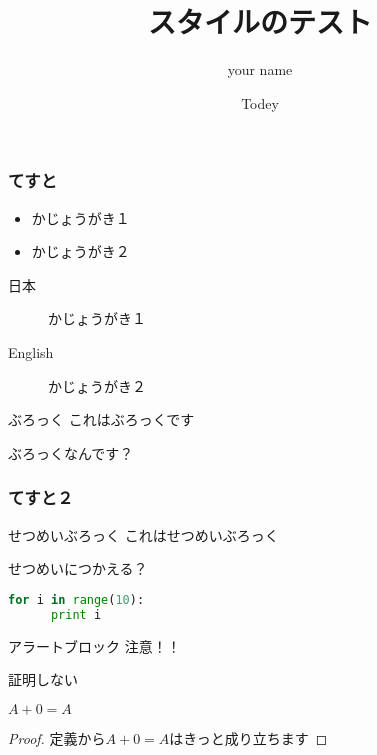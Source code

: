 \documentclass[17pt,aspectratio=1610,cjk,dvipdfmx]{beamer}
\title{スタイルのテスト}
\author{your name}
\date{Todey}
\begin{document}
\maketitle{}

\begin{frame}
  \frametitle{てすと}
  
  \begin{itemize}
      \item かじょうがき１
      \item かじょうがき２
  \end{itemize}

  \begin{description}
      \item[日本] かじょうがき１
      \item[English] かじょうがき２
  \end{description}
  
  \begin{block}{ぶろっく}
    これはぶろっくです

    ぶろっくなんです？
  \end{block}
\end{frame}

\begin{frame}[fragile]
  \frametitle{てすと２}

  \begin{exampleblock}{せつめいぶろっく}
    これはせつめいぶろっく

    せつめいにつかえる？

\begin{lstlisting}[language=Python, basicstyle=\small\ttfamily]
  for i in range(10):
      print i
\end{lstlisting}
  \end{exampleblock}

  \begin{alertblock}{アラートブロック}
    注意！！
  \end{alertblock}

\end{frame}


\begin{frame}{証明しない}
\begin{theorem}
  $A + 0 = A$
\end{theorem}
\begin{proof}
  定義から$A + 0 = A$はきっと成り立ちます
\end{proof}
\end{frame}
\end{document}
